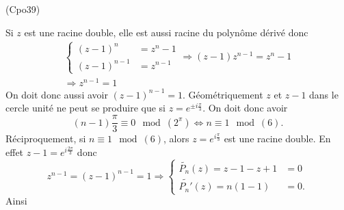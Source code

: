 \begin{tiny}(Cpo39)\end{tiny} Si $z$ est une racine double, elle est aussi racine du polynôme dérivé donc
\begin{multline*}
 \left\lbrace 
 \begin{aligned}
  (z-1)^n &= z^n - 1 \\ (z-1)^{n-1} &= z^{n-1}
 \end{aligned}
 \right. 
 \Rightarrow (z-1)z^{n-1} = z^n -1 \\
 \Rightarrow z^{n-1} = 1
\end{multline*}
On doit donc aussi avoir $(z-1)^{n-1}=1$. Géométriquement $z$ et $z-1$ dans le cercle unité ne peut se produire que si $z=e^{\pm i \frac{\pi}{3}}$. On doit donc avoir 
\[
 (n-1)\frac{\pi}{3} \equiv 0 \mod(2^\pi)
 \Leftrightarrow n \equiv 1 \mod(6).
\]
Réciproquement, si $n \equiv 1 \mod(6)$, alors $z=e^{i\frac{\pi}{3}}$ est une racine double. En effet $z-1=e^{i\frac{2\pi}{3}}$ donc 
\[
 z^{n-1} = (z-1)^{n-1} = 1 
 \Rightarrow 
 \left\lbrace 
 \begin{aligned}
   \widetilde{P_n}(z) = z - 1 -z +1 &= 0 \\
   \widetilde{P_n'}(z) = n(1-1) &= 0.
 \end{aligned}
\right. 
\]
Ainsi